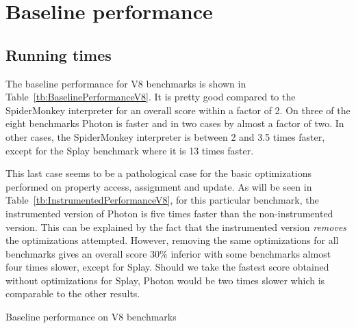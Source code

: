 \section{Baseline performance}

\subsection{Running times}

The baseline performance for V8 benchmarks is shown in
Table~\ref{tb:BaselinePerformanceV8}. It is pretty good compared to the
SpiderMonkey interpreter for an overall score within a factor of 2. On three of
the eight benchmarks Photon is faster and in two cases by almost a factor of
two. In other cases, the SpiderMonkey interpreter is between 2 and 3.5 times
faster, except for the Splay benchmark where it is 13 times faster. 

This last case seems to be a pathological case for the basic optimizations
performed on property access, assignment and update. As will be seen in
Table~\ref{tb:InstrumentedPerformanceV8}, for this particular benchmark, the
instrumented version of Photon is five times faster than the non-instrumented
version. This can be explained by the fact that the instrumented version
\textit{removes} the optimizations attempted. However, removing the same
optimizations for all benchmarks gives an overall score 30\% inferior with some
benchmarks almost four times slower, except for Splay. Should we take the
fastest score obtained without optimizations for Splay, Photon would be two
times slower which is comparable to the other results.

\begin{table}[htb]
\caption{Baseline performance on V8 benchmarks}
\centering
    
\label{tb:BaselinePerformanceV8}
\end{table}


